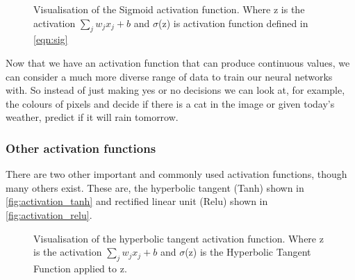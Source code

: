 \begin{figure}
\begin{center}
\caption{Visualisation of the Sigmoid activation function. Where z is the activation $\sum_{j} w_j x_j + b$ and $\sigma$(z) is activation function defined in \autoref{eqn:sig} }
\label{fig:activation_sigmoid}
\end{center}
\end{figure}

Now that we have an activation function that can produce continuous values, we can consider a much more diverse range of data to train our neural networks with. So instead of just making yes or no decisions we can look at, for example, the colours of pixels and decide if there is a cat in the image or given today's weather, predict if it will rain tomorrow.

\subsubsection{Other activation functions}
There are two other important and commonly used activation functions, though many others exist. These are, the hyperbolic tangent (Tanh) shown in \autoref{fig:activation_tanh} and rectified linear unit (Relu)  shown in \autoref{fig:activation_relu}.

\begin{figure}
\begin{center}
\caption{Visualisation of the hyperbolic tangent activation function. Where z is the activation $\sum_{j} w_j x_j + b$ and $\sigma$(z) is the Hyperbolic Tangent Function applied to z.}
\label{fig:activation_tanh}
\end{center}
\end{figure}

